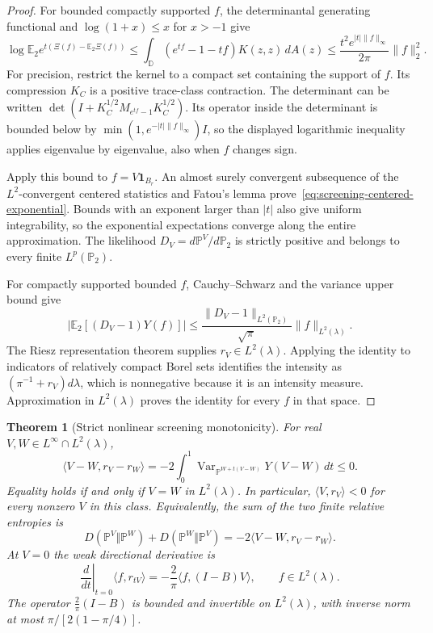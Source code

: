 \documentclass[11pt,a4paper]{article}
\numberwithin{equation}{section}
\newtheorem{theorem}{Theorem}[section]
\theoremstyle{definition}
\theoremstyle{remark}
\newcommand{\D}{\mathbb D}
\begin{document}
\begin{proof}
For bounded compactly supported $f$, the determinantal generating
functional and $\log(1+x)\le x$ for $x>-1$ give
\[
 \log\mathbb E_2e^{t(\Xi(f)-\mathbb E_2\Xi(f))}
 \le\int_\D (e^{tf}-1-tf)K(z,z)\,dA(z)
 \le \frac{t^2 e^{|t|\|f\|_\infty}}{2\pi}\|f\|_2^2.
\]
For precision, restrict the kernel to a compact set containing the
support of $f$.  Its compression $K_C$ is a positive trace-class
contraction.  The determinant can be written
$\det(I+K_C^{1/2}M_{e^{tf}-1}K_C^{1/2})$.
Its operator inside the determinant is bounded below by
$\min(1,e^{-|t|\|f\|_\infty})I$, so the displayed logarithmic
inequality applies eigenvalue by eigenvalue, also when $f$ changes
sign.

Apply this bound to $f=V\mathbf1_{B_r}$.  An almost surely convergent
subsequence of the $L^2$-convergent centered statistics and Fatou's
lemma prove~\eqref{eq:screening-centered-exponential}.  Bounds with
an exponent larger than $|t|$ also give uniform integrability, so the
exponential expectations converge along the entire approximation.
The likelihood $D_V=d\mathbb P^V/d\mathbb P_2$ is strictly positive
and belongs to every finite $L^p(\mathbb P_2)$.

For compactly supported bounded $f$, Cauchy--Schwarz and the variance
upper bound give
\[
 |\mathbb E_2[(D_V-1)Y(f)]|
 \le\frac{\|D_V-1\|_{L^2(\mathbb P_2)}}{\sqrt\pi}
                                      \|f\|_{L^2(\lambda)}.
\]
The Riesz representation theorem supplies $r_V\in L^2(\lambda)$.
Applying the identity to indicators of relatively compact Borel sets
identifies the intensity as
$(\pi^{-1}+r_V)d\lambda$, which is nonnegative because it is an
intensity measure.  Approximation in $L^2(\lambda)$ proves the
identity for every $f$ in that space.
\end{proof}

\begin{theorem}[Strict nonlinear screening monotonicity]
\label{thm:screening-tilt-monotonicity}
For real $V,W\in L^\infty\cap L^2(\lambda)$,
\begin{equation}
 \langle V-W,r_V-r_W\rangle
 =-2\int_0^1\operatorname{Var}_{\mathbb P^{W+t(V-W)}}
                              Y(V-W)\,dt\le0.
 \label{eq:screening-nonlinear-monotonicity}
\end{equation}
Equality holds if and only if $V=W$ in $L^2(\lambda)$.  In particular,
$\langle V,r_V\rangle<0$ for every nonzero $V$ in this class.
Equivalently, the sum of the two finite relative entropies is
\begin{equation}
 D(\mathbb P^V\Vert\mathbb P^W)
 +D(\mathbb P^W\Vert\mathbb P^V)
       =-2\langle V-W,r_V-r_W\rangle.
 \label{eq:screening-symmetric-entropy}
\end{equation}
At $V=0$ the weak directional derivative is
\begin{equation}
 \left.\frac{d}{dt}\right|_{t=0}
      \langle f,r_{tV}\rangle
 =-\frac2\pi\langle f,(I-B)V\rangle,
 \qquad f\in L^2(\lambda).
 \label{eq:screening-linear-response}
\end{equation}
The operator $\frac2\pi(I-B)$ is bounded and invertible on
$L^2(\lambda)$, with inverse norm at most
$\pi/[2(1-\pi/4)]$.
\end{theorem}
\end{document}
